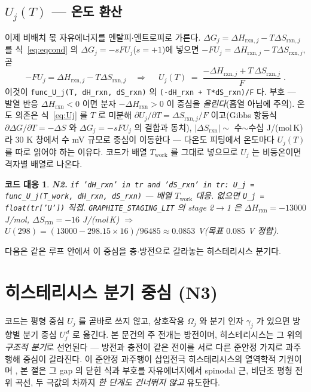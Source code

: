 \documentclass[11pt,a4paper]{article}
\newtheorem*{codebox}{코드 대응}
\newcommand{\rxn}{\mathrm{rxn}}
\newcommand{\work}{\mathrm{work}}
\newcommand{\code}[1]{\texttt{#1}}
\begin{document}
\subsection{$U_j(T)$ — 온도 환산}
이제 비배치 몫 자유에너지를 엔탈피$\cdot$엔트로피로 가른다. $\Delta G_j=\Delta H_{\rxn,j}-T\Delta S_{\rxn,j}$ 를
식~\eqref{eq:eqcond} 의 $\Delta G_j=-sFU_j$($s=+1$)에 넣으면 $-FU_j=\Delta H_{\rxn,j}-T\Delta S_{\rxn,j}$, 곧
\begin{equation}
-FU_j=\Delta H_{\rxn,j}-T\Delta S_{\rxn,j}
\quad\Longrightarrow\quad
\boxed{\;U_j(T)\;=\;\frac{-\Delta H_{\rxn,j}+T\,\Delta S_{\rxn,j}}{F}\;.}
\label{eq:Uj}
\end{equation}
이것이 \code{func\_U\_j(T, dH\_rxn, dS\_rxn)} 의 \code{(-dH\_rxn + T*dS\_rxn)/F} 다. 부호 — 발열 반응
$\Delta H_\rxn<0$ 이면 분자 $-\Delta H_\rxn>0$ 이 중심을 \emph{올린다}(흡열 아님에 주의). 온도 의존은 식~\eqref{eq:Uj}
를 $T$ 로 미분해 $\partial U_j/\partial T=\Delta S_{\rxn,j}/F$ 이고(Gibbs 항등식 $\partial\Delta G/\partial T=-\Delta S$
와 $\Delta G_j=-sFU_j$ 의 결합과 동치), $|\Delta S_\rxn|\sim$ 수$\sim$수십 J/(mol\,K) 라 $30$ K 창에서 수 mV 규모로
중심이 이동한다 — 다온도 피팅에서 온도마다 $U_j(T)$ 를 따로 읽어야 하는 이유다. 코드가 배열 $T_\work$ 를 그대로
넣으므로 $U_j$ 는 비등온이면 격자별 배열로 나온다.

\begin{codebox}
\textbf{N2.} \code{if 'dH\_rxn' in tr and 'dS\_rxn' in tr: U\_j = func\_U\_j(T\_work, dH\_rxn, dS\_rxn)}
— 배열 $T_\work$ 대응. 없으면 \code{U\_j = float(tr['U'])} 직접. \code{GRAPHITE\_STAGING\_LIT} 의 stage 2$\to$1 은
$\Delta H_\rxn=-13000$ J/mol, $\Delta S_\rxn=-16$ J/(mol\,K) $\Rightarrow$ $U(298)=(13000-298.15\times16)/96485
\approx0.0853$ V(목표 $0.085$ V 정합).
\end{codebox}

다음은 같은 루프 안에서 이 중심을 충$\cdot$방전으로 갈라놓는 히스테리시스 분기다.

\section{히스테리시스 분기 중심 (N3)}\label{sec:hys}
코드는 평형 중심 $U_j$ 를 곧바로 쓰지 않고, 상호작용 $\Omega_j$ 와 분기 인자 $\gamma_j$ 가 있으면 방향별 분기 중심
$U_j^{\,d}$ 로 옮긴다. 본 문건의 주 전개는 방전이며, 히스테리시스는 그 위의 \emph{구조적 분기}로 선언된다 — 방전과 충전이
같은 전이를 서로 다른 준안정 가지로 과주행해 중심이 갈라진다. 이 준안정 과주행이 삽입전극 히스테리시스의 열역학적
기원이며 \cite{dreyer2010}, 본 절은 그 gap 의 닫힌 식과 부호를 자유에너지에서 spinodal 근, 비단조 평형 전위 곡선,
두 극값의 차까지 \emph{한 단계도 건너뛰지 않고} 유도한다.
\end{document}
